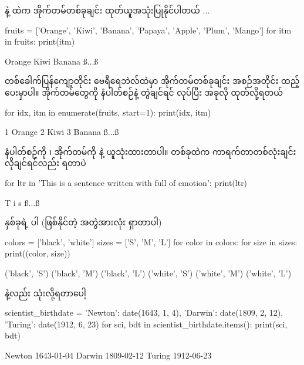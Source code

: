 
%



  နဲ့  ထဲက အိုက်တမ်တစ်ခုချင်း ထုတ်ယူအသုံးပြုနိုင်ပါတယ် $\ldots$
%
\begin{py}
fruits = ['Orange', 'Kiwi', 'Banana', 'Papaya', 'Apple', 'Plum', 'Mango']
for itm in fruits:
    print(itm)
\end{py}
%
%
\begin{codetxt}
Orange
Kiwi
Banana
ß$\ldots$ß
\end{codetxt}
%
 တစ်ခေါက်ပြန်ကျော့တိုင်း   ဗေရီရေဘဲလ်ထဲမှာ  အိုက်တမ်တစ်ခုချင်း အစဉ်အတိုင်း ထည့်ပေးမှာပါ။ အိုက်တမ်တွေကို နံပါတ်စဉ်နဲ့ တွဲချင်ရင်  လုပ်ပြီး အခုလို ထုတ်လို့ရတယ်  
%
\begin{py}
for idx, itm in enumerate(fruits, start=1):
    print(idx, itm)
\end{py}
%
%
\begin{codetxt}
1 Orange
2 Kiwi
3 Banana
ß$\ldots$ß
\end{codetxt}
%
နံပါတ်စဉ်ကို ၊ အိုက်တမ်ကို  နဲ့ ယူသုံးထားတာပါ။  တစ်ခုထဲက ကာရက်တာတစ်လုံးချင်း လိုချင်ရင်လည်း ရတာပဲ
%
\begin{py}
for ltr in 'This is a sentence written with full of emotion':
    print(ltr)
\end{py}
%
%
\begin{codetxt}
T
i
s 
ß$\ldots$ß
\end{codetxt}
%
 နှစ်ခုရဲ့  ပါ (ဖြစ်နိုင်တဲ့ အတွဲအားလုံး ရှာတာပါ)
%
\begin{py}
colors = ['black', 'white']
sizes = ['S', 'M', 'L']
for color in colors:
    for size in sizes:
        print((color, size))
\end{py}
%
%
\begin{codetxt}
('black', 'S')
('black', 'M')
('black', 'L')
('white', 'S')
('white', 'M')
('white', 'L')
\end{codetxt}
%

 နဲ့လည်း သုံးလို့ရတာပေါ့
%
\begin{py}
scientist_birthdate = {'Newton': date(1643, 1, 4),
                       'Darwin': date(1809, 2, 12),
                       'Turing': date(1912, 6, 23)}
for sci, bdt in scientist_birthdate.items():
    print(sci, bdt)
\end{py}
%
\begin{codetxt}
Newton 1643-01-04
Darwin 1809-02-12
Turing 1912-06-23
\end{codetxt}

